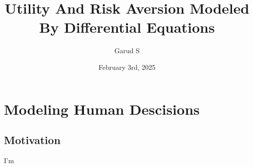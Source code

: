 \documentclass{beamer}
\title{Utility And Risk Aversion Modeled By Differential Equations}
\author{Garud S}
\date{February 3rd, 2025}
\begin{document}
\frame{\titlepage}
\section{Modeling Human Descisions}
    \subsection{Motivation}
        \begin{frame}
            I'm 
        \end{frame}
\end{document}
